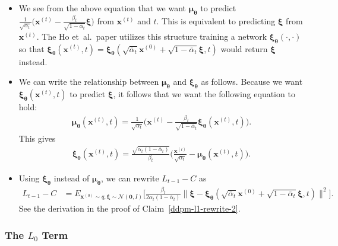 \documentclass[10pt]{article}
\newcommand{\ve}[1]{\mathbf{#1}}
\newcommand{\ves}[1]{\boldsymbol{#1}}
\newcommand{\etal}{{et~al.}}
\newcommand{\mcal}[1]{\mathcal{#1}}
\begin{document}
\begin{itemize}
\item We see from the above equation that we want $\ves{\mu}_{\ves{\theta}}$ to predict $\frac{1}{\sqrt{\alpha_t}} \bigg( \ve{x}^{(t)} - \frac{\beta_t}{\sqrt{1 - \overline{\alpha}_t}} \ves{\xi} \bigg)$ from $\ve{x}^{(t)}$ and $t$. This is equivalent to predicting $\ves{\xi}$ from $\ve{x}^{(t)}$. The Ho \etal\ paper utilizes this structure training a network $\ves{\xi}_{\ves{\theta}}(\cdot, \cdot)$ so that $\ves{\xi}_{\ves{\theta}}(\ve{x}^{(t)}, t) = \ves{\xi}_{\ves{\theta}}(\sqrt{\overline{\alpha}_t}\ve{x}^{(0)} + \sqrt{1 - \overline{\alpha}_t} \ves{\xi}, t)$ would return $\ves{\xi}$ instead.

\item We can write the relationship between $\ves{\mu}_{\ves{\theta}}$ and $\ves{\xi}_{\ves{\theta}}$ as follows. Because we want $\ves{\xi}_{\ves{\theta}}(\ve{x}^{(t)}, t)$ to predict $\ves{\xi}$, it follows that we want the following equation to hold:
\begin{align*}
  \ves{\mu}_{\ves{\theta}}(\ve{x}^{(t)}, t) = \frac{1}{\sqrt{\alpha_t}}  \bigg( \ve{x}^{(t)} - \frac{\beta_t}{\sqrt{1 - \overline{\alpha}_t}} \ves{\xi}_{\ves{\theta}}(\ve{x}^{(t)}, t) \bigg).
\end{align*}
This gives
\begin{align*}
  \ves{\xi}_{\ves{\theta}}(\ve{x}^{(t)},t) = \frac{\sqrt{\alpha_t (1 - \overline{\alpha}_t)}}{\beta_t} \bigg( \frac{\ve{x}^{(t)}}{\sqrt{\alpha_t}} - \ves{\mu}_{\ves{\theta}}(\ve{x}^{(t)}, t) \bigg).
\end{align*}


\item Using $\ves{\xi}_{\ves{\theta}}$ instead of $\ves{\mu}_{\ves{\theta}}$, we can rewrite $L_{t-1} - C$ as
\begin{align*}
  L_{t-1} - C   
  &= E_{\ve{x}^{(0)} \sim q, \ves{\xi} \sim \mcal{N}(\ve{0}, I)} \bigg[ \frac{\beta_t}{2 \alpha_t (1 - \overline{\alpha}_t)} \big\| \ves{\xi} - \ves{\xi}_{\ves{\theta}}(\sqrt{\overline{\alpha}_t}\ve{x}^{(0)} + \sqrt{1 - \overline{\alpha}_t}\ves{\xi},t) \big\|^2  \bigg].
\end{align*}
See the derivation in the proof of Claim~\ref{ddpm-l1-rewrite-2}.
\end{itemize}

\subsubsection{The $L_0$ Term}
\end{document}
